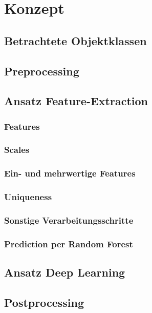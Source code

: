 
\chapter{Konzept}

\section{Betrachtete Objektklassen}

\section{Preprocessing}

\section{Ansatz Feature-Extraction}

\subsection{Features}

\subsection{Scales}

\subsection{Ein- und mehrwertige Features}

\subsection{Uniqueness}

\subsection{Sonstige Verarbeitungsschritte} %

\subsection{Prediction per Random Forest} %

\section{Ansatz Deep Learning} %

\section{Postprocessing}